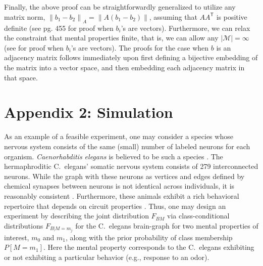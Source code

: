 \documentclass{article}
\newcommand{\mM}{\mathcal{M}}
\providecommand{\norm}[1]{\left \lVert#1 \right  \rVert}
\newcommand{\T}{^{\ensuremath{\mathsf{T}}}}           %
\begin{document}
Finally, the above proof can be straightforwardly generalized to utilize any matrix norm, $\norm{b_1-b_2}_A=\norm{A(b_1-b_2)}$, assuming that $A A\T$ is positive definite (see \cite{DGL96} pg. 455 for proof when $b_i$'s are vectors).  Furthermore, we can relax the constraint that mental properties finite, that is, we can allow any $|\mM| = \infty$ (see \cite{Stone77} for proof when $b_i$'s are vectors).  The proofs for the case when $b$ is an adjacency matrix follows immediately upon first defining a bijective embedding of the matrix into a vector space, and then embedding each adjacency matrix in that space.  

\section*{Appendix 2: Simulation} \label{simulation}

As an example of a feasible experiment, one may consider a species whose nervous system consists of the same (small) number of labeled neurons for each organism. {\it Caenorhabditis elegans} is believed to be such a species \cite{Durbin87}. The hermaphroditic C.~elegans' somatic nervous system consists of 279 interconnected neurons. While the graph with these neurons as vertices and edges defined by chemical synapses between neurons is not identical across individuals, it is reasonably consistent \cite{Durbin87}. Furthermore, these animals exhibit a rich behavioral repertoire that depends on circuit properties \cite{deBonoMaricq05}. Thus, one may design an experiment by describing the joint distribution $F_{BM}$ via class-conditional distributions $F_{B|M=m_j}$ for the C.~elegans brain-graph for two mental properties of interest, $m_0$ and $m_1$, along with the prior probability of class membership $P[M=m_1]$. Here the mental property corresponds to the C.~elegans exhibiting or not exhibiting a particular behavior (e.g., response to an odor).
\end{document}
